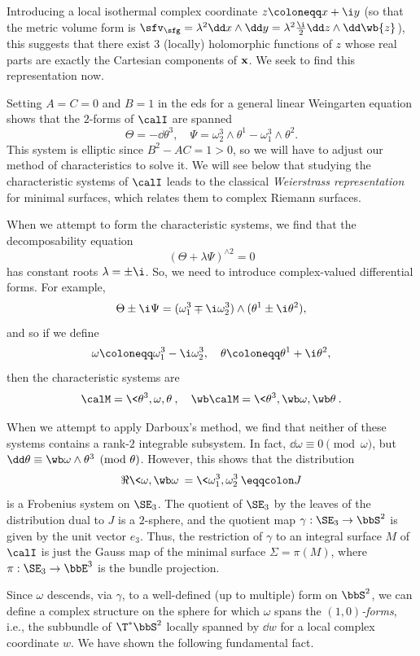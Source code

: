 Introducing a local isothermal complex coordinate $z\coloneqq x+\i y$ (so that the metric volume form is $\sfv_\sfg=\lambda^2\dd x\wedge\dd y=\lambda^2\frac{\i}{2}\dd z\wedge\dd\wb{z}$), this suggests that there exist $3$ (locally) holomorphic functions of $z$ whose real parts are exactly the Cartesian components of $\bf{x}$. We seek to find this representation now.

Setting $A=C=0$ and $B=1$ in the \gls{eds} for a general linear Weingarten equation shows that the $2$-forms of $\calI$ are spanned 
\[\Theta=-\dd\theta^3,\quad \Psi=\omega^3_2\wedge\theta^1-\omega^3_1\wedge\theta^2.\]
This system is elliptic since $B^2-AC=1>0$, so we will have to adjust our method of characteristics to solve it. We will see below that studying the characteristic systems of $\calI$ leads to the classical \emph{Weierstrass representation} for minimal surfaces, which relates them to complex Riemann surfaces.

When we attempt to form the characteristic systems, we find that the decomposability equation 
\[(\Theta+\lambda\Psi)^{\wedge 2}=0\]
has constant roots $\lambda=\pm\i$. So, we need to introduce complex-valued differential forms. For example,
\[\Theta\pm \i \Psi=(\omega^3_1\mp \i \omega^3_2)\wedge(\theta^1\pm\i \theta^2),\]
and so if we define 
\[\omega\coloneqq \omega^3_1-\i \omega^3_2,\quad \theta\coloneqq \theta^1+\i \theta^2,\]
then the characteristic systems are 
\[\calM=\<\theta^3,\omega,\theta\>,\quad \wb\calM=\<\theta^3,\wb\omega,\wb\theta\>.\]

When we attempt to apply Darboux's method, we find that neither of these systems contains a rank-$2$ integrable subsystem. In fact, $\dd\omega\equiv 0\pmod{\omega}$, but $\dd\theta\equiv \wb\omega\wedge\theta^3\pmod{\theta}$. However, this shows that the distribution
\[\Re\<\omega,\wb\omega\>=\<\omega^3_1,\omega^3_2\>\eqqcolon J\]
is a Frobenius system on $\SE_3$. The quotient of $\SE_3$ by the leaves of the distribution dual to $J$ is a $2$-sphere, and the quotient map $\gamma:\SE_3\to \bbS^2$ is given by the unit vector $e_3$. Thus, the restriction of $\gamma$ to an integral surface $M$ of $\calI$ is just the Gauss map of the minimal surface $\Sigma=\pi(M)$, where $\pi:\SE_3\to \bbE^3$ is the bundle projection.

Since $\omega$ descends, via $\gamma$, to a well-defined (up to multiple) form on $\bbS^2$, we can define a complex structure on the sphere for which $\omega$ spans the \emph{$(1,0)$-forms}, i.e., the subbundle of $\T^\ast \bbS^2$ locally spanned by $\dd w$ for a local complex coordinate $w$. We have shown the following fundamental fact.

